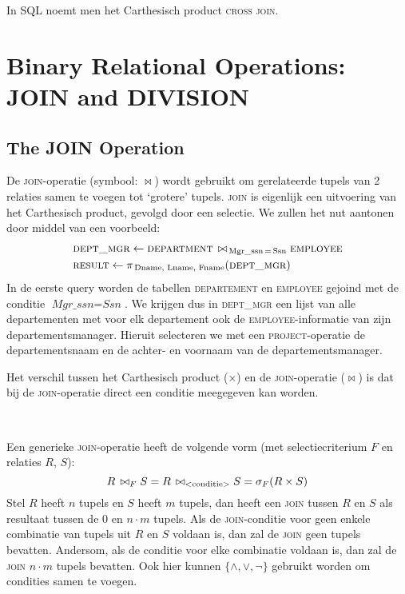 In SQL noemt men het Carthesisch product \textsc{cross join}.



\section{Binary Relational Operations: JOIN and DIVISION}
\subsection{The JOIN Operation}
De \textsc{join}-operatie (symbool: $\bowtie$) wordt gebruikt om gerelateerde tupels van 2 relaties samen te voegen tot `grotere' tupels. \textsc{join} is eigenlijk een uitvoering van het Carthesisch product, gevolgd door een selectie. We zullen het nut aantonen door middel van een voorbeeld:
\vspace{-2mm}
\begin{align*}
&\textsc{dept\_mgr} \leftarrow \textsc{department} \,\bowtie_{\,\text{Mgr\_ssn} \,=\, \text{Ssn}} \textsc{employee}\\
&\textsc{result} \leftarrow \pi_{\,\text{Dname, Lname, Fname}}(\textsc{dept\_mgr})\\
\end{align*}
In de eerste query worden de tabellen \textsc{departement} en \textsc{employee} gejoind met de conditie $\textit{Mgr\_ssn}=\textit{Ssn}$. We krijgen dus in \textsc{dept\_mgr} een lijst van alle departementen met voor elk departement ook de \textsc{employee}-informatie van zijn departementsmanager. Hieruit selecteren we met een \textsc{project}-operatie de departementsnaam en de achter- en voornaam van de departementsmanager.

Het verschil tussen het Carthesisch product ($\times$) en de \textsc{join}-operatie ($\bowtie$) is dat bij de \textsc{join}-operatie direct een conditie meegegeven kan worden.

~

\noindent Een generieke \textsc{join}-operatie heeft de volgende vorm (met selectiecriterium $F$ en relaties $R$, $S$):
\vspace{-2mm}
\[ R \,\bowtie_F S = R \,\bowtie_{\text{{\textless}conditie{\textgreater}}} S = \sigma_F(R \times S) \]
Stel $R$ heeft $n$ tupels en $S$ heeft $m$ tupels, dan heeft een \textsc{join} tussen $R$ en $S$ als resultaat tussen de $0$ en $n \cdot m$ tupels. Als de \textsc{join}-conditie voor geen enkele combinatie van tupels uit $R$ en $S$ voldaan is, dan zal de \textsc{join} geen tupels bevatten. Andersom, als de conditie voor elke combinatie voldaan is, dan zal de \textsc{join} $n \cdot m$ tupels bevatten. Ook hier kunnen $\{ \wedge, \vee, \neg \}$ gebruikt worden om condities samen te voegen.

